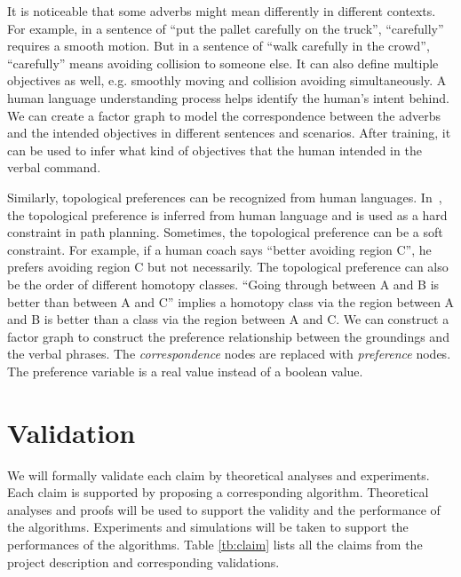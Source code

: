 \documentclass[phd]{byuprop}
\begin{document}
It is noticeable that some adverbs might mean differently in different contexts.
For example, in a sentence of ``put the pallet carefully on the truck'', ``carefully'' requires a smooth motion. 
But in a sentence of ``walk carefully in the crowd'', ``carefully'' means avoiding collision to someone else.
It can also define multiple objectives as well, e.g. smoothly moving and collision avoiding simultaneously.
A human language understanding process helps identify the human's intent behind.
We can create a factor graph to model the correspondence between the adverbs and the intended objectives in different sentences and scenarios.
After training, it can be used to infer what kind of objectives that the human intended in the verbal command.

Similarly, topological preferences can be recognized from human languages.
In~\cite{howard2014natural}, the topological preference is inferred from human language and is used as a hard constraint in path planning.
Sometimes, the topological preference can be a soft constraint.
For example, if a human coach says ``better avoiding region C'', he prefers avoiding region C but not necessarily.
The topological preference can also be the order of different homotopy classes.
``Going through between A and B is better than between A and C'' implies a homotopy class via the region between A and B is better than a class via the region between A and C.
We can construct a factor graph to construct the preference relationship between the groundings and the verbal phrases.
The {\em correspondence} nodes are replaced with {\em preference} nodes.
The preference variable is a real value instead of a boolean value.


\section{Validation}
\label{sec:validation}

We will formally validate each claim by theoretical analyses and experiments.
Each claim is supported by proposing a corresponding algorithm.
Theoretical analyses and proofs will be used to support the validity and the performance of the algorithms.
Experiments and simulations will be taken to support the performances of the algorithms.
Table \ref{tb:claim} lists all the claims from the project description and corresponding validations.
\end{document}
